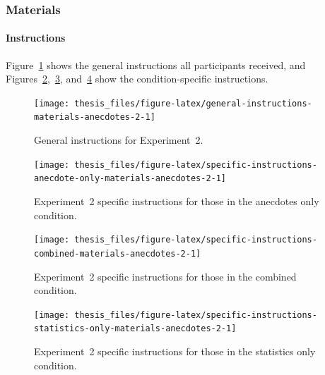 \documentclass[a4paper, nobind, dvipsnames]{templates/ociamthesis}
\theoremstyle{definition}
\theoremstyle{definition}
\theoremstyle{definition}
\theoremstyle{definition}
\theoremstyle{remark}
\begin{document}
\newpage

\subsubsection{Materials}

\hypertarget{instructions-materials-anecdotes-2-appendix}{%
\paragraph{Instructions}\label{instructions-materials-anecdotes-2-appendix}}

Figure~\ref{fig:general-instructions-materials-anecdotes-2} shows the general
instructions all participants received, and
Figures~\ref{fig:specific-instructions-anecdote-only-materials-anecdotes-2},~\ref{fig:specific-instructions-combined-materials-anecdotes-2},
and~\ref{fig:specific-instructions-statistics-only-materials-anecdotes-2} show
the condition-specific instructions.



\begin{figure}
\texttt{[image: thesis\_files/figure-latex/general-instructions-materials-anecdotes-2-1]} \caption{General instructions for Experiment~2.}\label{fig:general-instructions-materials-anecdotes-2}
\end{figure}



\begin{figure}
\texttt{[image: thesis\_files/figure-latex/specific-instructions-anecdote-only-materials-anecdotes-2-1]} \caption{Experiment~2 specific instructions for those in the anecdotes only condition.}\label{fig:specific-instructions-anecdote-only-materials-anecdotes-2}
\end{figure}



\begin{figure}
\texttt{[image: thesis\_files/figure-latex/specific-instructions-combined-materials-anecdotes-2-1]} \caption{Experiment~2 specific instructions for those in the combined condition.}\label{fig:specific-instructions-combined-materials-anecdotes-2}
\end{figure}



\begin{figure}
\texttt{[image: thesis\_files/figure-latex/specific-instructions-statistics-only-materials-anecdotes-2-1]} \caption{Experiment~2 specific instructions for those in the statistics only condition.}\label{fig:specific-instructions-statistics-only-materials-anecdotes-2}
\end{figure}
\end{document}
